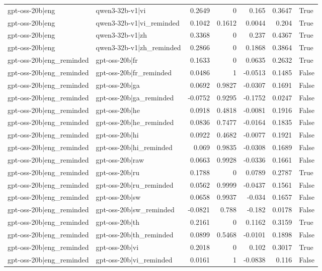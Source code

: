 \begin{table}
\begin{tabular}{l l r r r r l}
gpt-oss-20b|eng & qwen3-32b-v1|vi & 0.2649 & 0 & 0.165 & 0.3647 & True \\
gpt-oss-20b|eng & qwen3-32b-v1|vi_reminded & 0.1042 & 0.1612 & 0.0044 & 0.204 & True \\
gpt-oss-20b|eng & qwen3-32b-v1|zh & 0.3368 & 0 & 0.237 & 0.4367 & True \\
gpt-oss-20b|eng & qwen3-32b-v1|zh_reminded & 0.2866 & 0 & 0.1868 & 0.3864 & True \\
gpt-oss-20b|eng_reminded & gpt-oss-20b|fr & 0.1633 & 0 & 0.0635 & 0.2632 & True \\
gpt-oss-20b|eng_reminded & gpt-oss-20b|fr_reminded & 0.0486 & 1 & -0.0513 & 0.1485 & False \\
gpt-oss-20b|eng_reminded & gpt-oss-20b|ga & 0.0692 & 0.9827 & -0.0307 & 0.1691 & False \\
gpt-oss-20b|eng_reminded & gpt-oss-20b|ga_reminded & -0.0752 & 0.9295 & -0.1752 & 0.0247 & False \\
gpt-oss-20b|eng_reminded & gpt-oss-20b|he & 0.0918 & 0.4818 & -0.0081 & 0.1916 & False \\
gpt-oss-20b|eng_reminded & gpt-oss-20b|he_reminded & 0.0836 & 0.7477 & -0.0164 & 0.1835 & False \\
gpt-oss-20b|eng_reminded & gpt-oss-20b|hi & 0.0922 & 0.4682 & -0.0077 & 0.1921 & False \\
gpt-oss-20b|eng_reminded & gpt-oss-20b|hi_reminded & 0.069 & 0.9835 & -0.0308 & 0.1689 & False \\
gpt-oss-20b|eng_reminded & gpt-oss-20b|raw & 0.0663 & 0.9928 & -0.0336 & 0.1661 & False \\
gpt-oss-20b|eng_reminded & gpt-oss-20b|ru & 0.1788 & 0 & 0.0789 & 0.2787 & True \\
gpt-oss-20b|eng_reminded & gpt-oss-20b|ru_reminded & 0.0562 & 0.9999 & -0.0437 & 0.1561 & False \\
gpt-oss-20b|eng_reminded & gpt-oss-20b|sw & 0.0658 & 0.9937 & -0.034 & 0.1657 & False \\
gpt-oss-20b|eng_reminded & gpt-oss-20b|sw_reminded & -0.0821 & 0.788 & -0.182 & 0.0178 & False \\
gpt-oss-20b|eng_reminded & gpt-oss-20b|th & 0.2161 & 0 & 0.1162 & 0.3159 & True \\
gpt-oss-20b|eng_reminded & gpt-oss-20b|th_reminded & 0.0899 & 0.5468 & -0.0101 & 0.1898 & False \\
gpt-oss-20b|eng_reminded & gpt-oss-20b|vi & 0.2018 & 0 & 0.102 & 0.3017 & True \\
gpt-oss-20b|eng_reminded & gpt-oss-20b|vi_reminded & 0.0161 & 1 & -0.0838 & 0.116 & False \\

\end{tabular}
\end{table}
